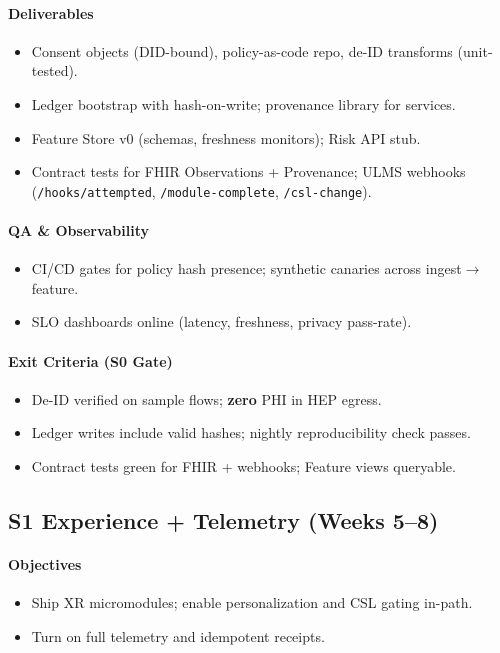 \documentclass[11pt]{article}
\theoremstyle{plain}
\begin{document}
\paragraph{Deliverables}
\begin{itemize}
  \item Consent objects (DID-bound), policy-as-code repo, de-ID transforms (unit-tested).
  \item Ledger bootstrap with hash-on-write; provenance library for services.
  \item Feature Store v0 (schemas, freshness monitors); Risk API stub.
  \item Contract tests for FHIR Observations + Provenance; ULMS webhooks (\texttt{/hooks/attempted}, \texttt{/module-complete}, \texttt{/csl-change}).
\end{itemize}
\paragraph{QA \& Observability}
\begin{itemize}
  \item CI/CD gates for policy hash presence; synthetic canaries across ingest$\rightarrow$feature.
  \item SLO dashboards online (latency, freshness, privacy pass-rate).
\end{itemize}
\paragraph{Exit Criteria (S0 Gate)}
\begin{itemize}
  \item De-ID verified on sample flows; \textbf{zero} PHI in HEP egress.
  \item Ledger writes include valid hashes; nightly reproducibility check passes.
  \item Contract tests green for FHIR + webhooks; Feature views queryable.
\end{itemize}

\subsection{S1 Experience + Telemetry (Weeks 5--8)}
\paragraph{Objectives}
\begin{itemize}
  \item Ship XR micromodules; enable personalization and CSL gating in-path.
  \item Turn on full telemetry and idempotent receipts.
\end{itemize}
\end{document}
